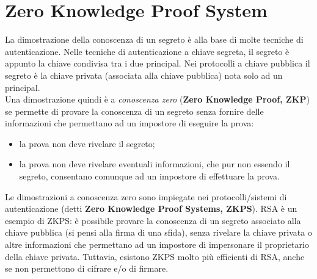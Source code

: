 \section{Zero Knowledge Proof System}
La dimostrazione della conoscenza di un segreto è alla base di molte tecniche di autenticazione. Nelle tecniche di autenticazione a chiave segreta, il segreto è appunto la chiave condivisa tra i due principal. Nei protocolli a chiave pubblica il segreto è la chiave privata (associata alla chiave pubblica) nota solo ad un principal. \\
Una dimostrazione quindi è a \textit{conoscenza zero} (\textbf{Zero Knowledge Proof, ZKP}) se permette di provare la conoscenza di un segreto senza fornire delle informazioni che permettano ad un impostore di eseguire la prova: 
\begin{itemize}
\item la prova non deve rivelare il segreto;
\item la prova non deve rivelare eventuali informazioni, che pur non essendo il segreto, consentano comunque ad un impostore di effettuare la prova.
\end{itemize}
Le dimostrazioni a conoscenza zero sono impiegate nei protocolli/sistemi di autenticazione (detti \textbf{Zero Knowledge Proof Systems, ZKPS}). RSA è un esempio di ZKPS: è possibile provare la conoscenza di un segreto associato alla chiave pubblica (si pensi alla firma di una sfida), senza rivelare la chiave privata o altre informazioni che permettano ad un impostore di impersonare il proprietario della chiave privata. Tuttavia, esistono ZKPS molto più efficienti di RSA, anche se non permettono di cifrare e/o di firmare. 

